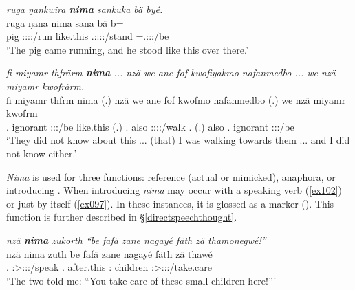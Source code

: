\begin{exe}
	\ex \emph{ruga ŋankwira \textbf{nima} sankuka bä byé.}\\
	\gll ruga ŋana nima sana bä b=\\
	pig \Stsg:\Sbj:\Pst:\Ipfv:\Venit/run {like.this} \Tsg.\Masc:\Sbj:\Pst:\Pfv:\Venit/stand \Med{} \Med{}=\Tsg.\Masc:\Sbj:\Nonpast:\Ipfv/be\\
	\trans `The pig came running, and he stood like this over there.'
	\label{ex099}
\end{exe}
\begin{exe}
	\ex \emph{fi miyamr thfrärm \textbf{nima} ... nzä we ane fof kwofiyakmo nafanmedbo ... we nzä miyamr kwofrärm.}\\
	\gll fi miyamr thfrm nima (.) nzä we ane fof kwofmo nafanmedbo (.) we nzä miyamr kwofrm\\
	\Third.{\Abs} ignorant \Stpl:\Sbj:\Pst:\Dur/be {like.this} (.) \Fsg.{\Abs} also {\Dem} {\Emph} \Fsg:\Sbj:\Pst:\Dur:\Andat/walk \Third{}{\Nsg}.{\All} (.) also \Fsg.{\Abs} ignorant \Fsg:\Sbj:\Pst:\Dur/be\\
	\trans `They did not know about this ... (that) I was walking towards them ... and I did not know either.' 
	\label{ex100}
\end{exe}

\emph{Nima} is used for three functions:  reference (actual or mimicked), anaphora, or introducing . When introducing  \emph{nima} may occur with a speaking verb (\ref{ex102}) or just by itself (\ref{ex097}). In these instances, it is glossed as a  marker (\Quot). This function is further described in {\S}\ref{directspeechthought}.

\begin{exe}
	\ex \emph{nzä \textbf{nima} zukorth ``be fafä zane nagayé fäth zä thamonegwé!''}\\
	\gll nzä nima zuth be fafä zane nagayé fäth zä thawé\\
	\Fsg.{\Abs} {\Quot} \Stdu:\Sbj>\Fsg:\Obj:\Pst:\Pfv/speak \Ssg{}.{\Erg} after.this {\Dem}:{\Prox} children \Dim{} {\Prox} \Ssg:\Sbj>\Stpl:\Obj:\Imp:\Ipfv/take.care\\
	\trans `The two told me: ``You take care of these small children here!'''\\ 
	\label{ex102}
\end{exe}

